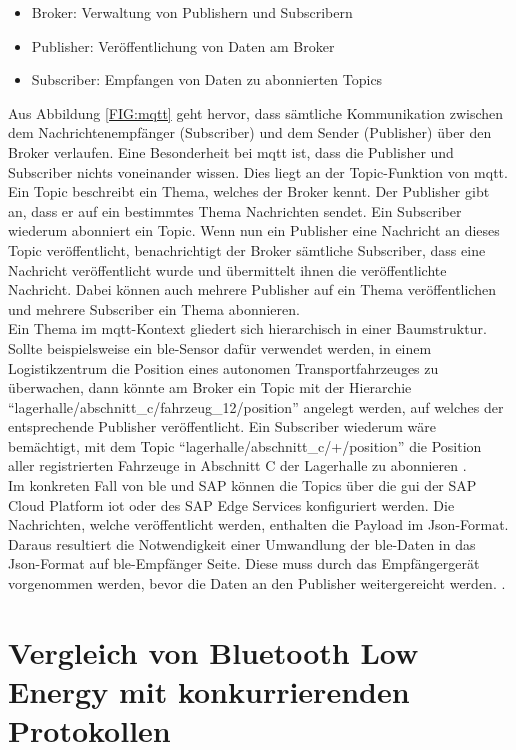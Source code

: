 \begin{itemize}
	\setlength{\itemsep}{1pt}
	\item{Broker: Verwaltung von Publishern und Subscribern}
	\item{Publisher: Veröffentlichung von Daten am Broker}
	\item{Subscriber: Empfangen von Daten zu abonnierten Topics}
\end{itemize}
\noindent Aus Abbildung \ref{FIG:mqtt} geht hervor, dass sämtliche Kommunikation zwischen dem Nachrichtenempfänger (Subscriber) und dem Sender (Publisher) über den Broker verlaufen. Eine Besonderheit bei \ac{mqtt} ist, dass die Publisher und Subscriber nichts voneinander wissen. Dies liegt an der Topic-Funktion von \ac{mqtt}. Ein Topic beschreibt ein Thema, welches der Broker kennt. Der Publisher gibt an, dass er auf ein bestimmtes Thema Nachrichten sendet. Ein Subscriber wiederum abonniert ein Topic. Wenn nun ein Publisher eine Nachricht an dieses Topic veröffentlicht, benachrichtigt der Broker sämtliche Subscriber, dass eine Nachricht veröffentlicht wurde und übermittelt ihnen die veröffentlichte Nachricht. Dabei können auch mehrere Publisher auf ein Thema veröffentlichen und mehrere Subscriber ein Thema abonnieren.\\
\noindent Ein Thema im \ac{mqtt}-Kontext gliedert sich hierarchisch in einer Baumstruktur. Sollte beispielsweise ein \ac{ble}-Sensor dafür verwendet werden, in einem Logistikzentrum die Position eines autonomen Transportfahrzeuges zu überwachen, dann könnte am Broker ein Topic mit der Hierarchie "`lagerhalle/abschnitt\_c/fahrzeug\_12/position"' angelegt werden, auf welches der entsprechende Publisher veröffentlicht. Ein Subscriber wiederum wäre bemächtigt, mit dem Topic "`lagerhalle/abschnitt\_c/+/position"' die Position aller registrierten Fahrzeuge in Abschnitt C der Lagerhalle zu abonnieren \cite{MQTT19:WWW}.\\
\noindent Im konkreten Fall von \ac{ble} und SAP können die Topics über die \ac{gui} der SAP Cloud Platform \ac{iot} oder des SAP Edge Services konfiguriert werden. Die Nachrichten, welche veröffentlicht werden, enthalten die Payload im Json-Format. Daraus resultiert die Notwendigkeit einer Umwandlung der \ac{ble}-Daten in das Json-Format auf \ac{ble}-Empfänger Seite. Diese muss durch das Empfängergerät vorgenommen werden, bevor die Daten an den Publisher weitergereicht werden. \cite[Seite 247]{Holtschulte20:IOS}.\\ 

\section{Vergleich von Bluetooth Low Energy mit konkurrierenden Protokollen}
\label{s:vergleich} 

